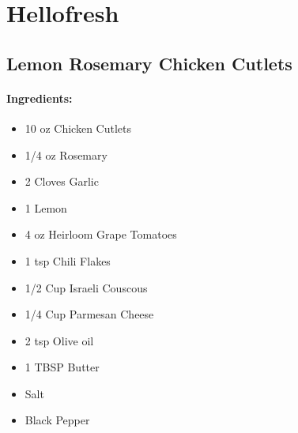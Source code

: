 \documentclass{article}
\begin{document}
\section{Hellofresh}


\subsection{Lemon Rosemary Chicken Cutlets}

\paragraph{Ingredients:}
\begin{itemize}
    \item 10 oz Chicken Cutlets
    \item 1/4 oz Rosemary
    \item 2 Cloves Garlic
    \item 1 Lemon
    \item 4 oz Heirloom Grape Tomatoes
    \item 1 tsp Chili Flakes
    \item 1/2 Cup Israeli Couscous
    \item 1/4 Cup Parmesan Cheese
    \item 2 tsp Olive oil
    \item 1 TBSP Butter
    \item Salt
    \item Black Pepper
\end{itemize}
\end{document}
